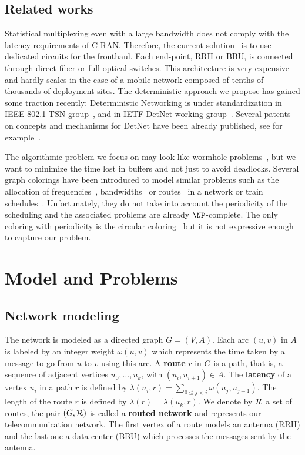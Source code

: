 \documentclass[10pt, conference, letterpaper]{IEEEtran}
\begin{document}
   \subsection*{Related works}
   
 Statistical multiplexing even with a large bandwidth does not comply with the latency requirements of C-RAN. Therefore, the current solution~\cite{pizzinat2015things,tayq2017real} is to use dedicated circuits for the fronthaul. Each end-point, RRH or BBU, is connected through direct fiber or full optical switches. This architecture is very expensive and hardly scales in the case of a mobile network composed of tenths of thousands of deployment sites. The deterministic approach we propose has gained some traction recently: Deterministic Networking is under standardization in IEEE 802.1 TSN group~\cite{finn-detnet-architecture-08}, and in  IETF DetNet working group~\cite{ieee802}. Several patents on concepts and mechanisms for DetNet have been already published, see for example~\cite{howe2005time,leclerc2016transmission}. 
     
The algorithmic problem we focus on may look like wormhole problems~\cite{cole1996benefit}, but  we want to minimize the time lost in buffers and not just to avoid deadlocks. Several graph colorings have been introduced to model similar problems such as the allocation of frequencies~\cite{borndorfer1998frequency}, bandwidths~\cite{erlebach2001complexity} or routes~\cite{cole1996benefit} in a network or train schedules~\cite{strotmann2007railway}. Unfortunately, they do not take into account the periodicity of the scheduling and the associated problems are already $\NP$-complete. The only coloring with periodicity is the circular coloring~\cite{zhou2013multiple} but it is not expressive enough to capture our problem.

\section{Model and Problems}\label{sec:def}

  \subsection{Network modeling}
  

The network is modeled as a directed graph $G=(V,A)$. Each arc  $(u,v)$ in $A$ is labeled by an integer weight $\omega(u,v)$ which represents the time taken by a message to go from $u$ to $v$ using this arc. A {\bf route} $r$ in $G$ is a path, that is, a sequence of adjacent vertices $u_0, \ldots , u_{k}$, with $(u_i,u_{i+1}) \in A$.  The {\bf latency} of a vertex $u_i$ in a path $r$ is defined by $\lambda(u_i,r)= \sum\limits_{0 \leq j <i} \omega(u_j, u_{j+1})$.
The length of the route $r$ is defined by $\lambda (r)= \lambda (u_k,r)$.
We denote by $\cal R$ a set of routes, the pair $(G,\cal R)$ is called a {\bf routed network} and represents our telecommunication network. The first vertex of a route models an antenna (RRH) and the last one a data-center (BBU) which processes the messages sent by the antenna.
\end{document}
